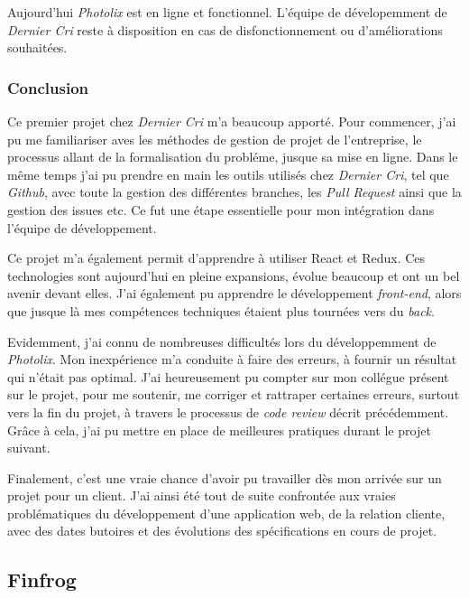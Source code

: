 \bigskip

Aujourd'hui \emph{Photolix} est en ligne et fonctionnel. L'équipe de
dévelopemment de \emph{Dernier Cri} reste à disposition en cas de
disfonctionnement ou d'améliorations souhaitées.

\subsubsection{Conclusion}\label{conclusion}

\bigskip

Ce premier projet chez \emph{Dernier Cri} m'a beaucoup apporté. Pour
commencer, j'ai pu me familiariser aves les méthodes de gestion de
projet de l'entreprise, le processus allant de la formalisation du
probléme, jusque sa mise en ligne. Dans le même temps j'ai pu prendre en
main les outils utilisés chez \emph{Dernier Cri}, tel que \emph{Github},
avec toute la gestion des différentes branches, les \emph{Pull Request}
ainsi que la gestion des issues etc. Ce fut une étape essentielle pour
mon intégration dans l'équipe de développement.

\bigskip

Ce projet m'a également permit d'apprendre à utiliser React et Redux.
Ces technologies sont aujourd'hui en pleine expansions, évolue beaucoup
et ont un bel avenir devant elles. J'ai également pu apprendre le
développement \emph{front-end}, alors que jusque là mes compétences
techniques étaient plus tournées vers du \emph{back}.

\bigskip

Evidemment, j'ai connu de nombreuses difficultés lors du développemment
de \emph{Photolix}. Mon inexpérience m'a conduite à faire des erreurs, à
fournir un résultat qui n'était pas optimal. J'ai heureusement pu
compter sur mon collégue présent sur le projet, pour me soutenir, me
corriger et rattraper certaines erreurs, surtout vers la fin du projet,
à travers le processus de \emph{code review} décrit précédemment. Grâce
à cela, j'ai pu mettre en place de meilleures pratiques durant le projet
suivant.

\bigskip

Finalement, c'est une vraie chance d'avoir pu travailler dès mon arrivée
sur un projet pour un client. J'ai ainsi été tout de suite confrontée
aux vraies problématiques du développement d'une application web, de la
relation cliente, avec des dates butoires et des évolutions des
spécifications en cours de projet.

\subsection{Finfrog}\label{finfrog}

